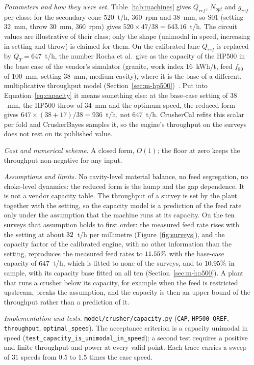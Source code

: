 \emph{Parameters and how they were set.} Table~\ref{tab:machines} gives $Q_{ref}$, $N_{opt}$ and $g_{ref}$ per class: for the secondary
cone $520$~t/h, $360$~rpm and $38$~mm, so S01 (setting $32$~mm, throw $30$~mm, $360$~rpm) gives $520\times47/38=643.16$~t/h. The circuit
values are illustrative of their class; only the shape (unimodal in speed, increasing in setting and throw) is claimed for them. On the
calibrated lane $Q_{ref}$ is replaced by $Q_T=647$~t/h, the number Rocha et al.\ give as the capacity of the HP500 in the base case
of the vendor's simulator (granite, work index $16$~kWh/t, feed $f_{80}$ of $100$~mm, setting $38$~mm, medium cavity), where it is
the base of a different, multiplicative throughput model (Section~\ref{sec:m-hp500})~\cite{rocha2024}. Put into
Equation~\eqref{eq:capacity} it means something else: at the base-case setting of $38$~mm, the HP500 throw of $34$~mm and the
optimum speed, the reduced form gives $647\times(38+17)/38=936$~t/h, not $647$~t/h. CrusherCal refits this scalar per fold and
CrusherBayes samples it, so the engine's throughput on the surveys does not rest on its published value.

\emph{Cost and numerical scheme.} A closed form, $O(1)$; the floor at zero keeps the throughput non-negative for any input.

\emph{Assumptions and limits.} No cavity-level material balance, no feed segregation, no choke-level dynamics: the reduced form is the
hump and the gap dependence. It is not a vendor capacity table. The throughput of a survey is set by the plant together with the
setting, so the capacity model is a prediction of the feed rate only under the assumption that the machine runs at its capacity. On the ten
surveys that assumption holds to first order: the measured feed rate rises with the setting at about $32$~t/h per millimetre
(Figure~\ref{fig:surveys}), and the capacity factor of the calibrated engine, with no other information than the setting, reproduces the
measured feed rates to $11.55\%$ with the base-case capacity of $647$~t/h, which is fitted to none of the surveys, and to
$10.95\%$ in sample, with its capacity base fitted on all ten (Section~\ref{sec:m-hp500}). A plant that runs a crusher below its capacity, for example when the
feed is restricted upstream, breaks the assumption, and the capacity is then an upper bound of the throughput rather than a prediction of it.

\emph{Implementation and tests.} \texttt{model/\allowbreak{}crusher/\allowbreak{}capacity.py} (\texttt{CAP}, \texttt{HP500\_QREF}, \texttt{throughput},
\texttt{optimal\_speed}). The acceptance criterion is a capacity unimodal in speed (\texttt{test\_capacity\_is\_unimodal\_in\_speed}); a
second test requires a positive and finite throughput and power at every valid point. Each trace carries a sweep of $31$ speeds from
$0.5$ to $1.5$ times the case speed.

